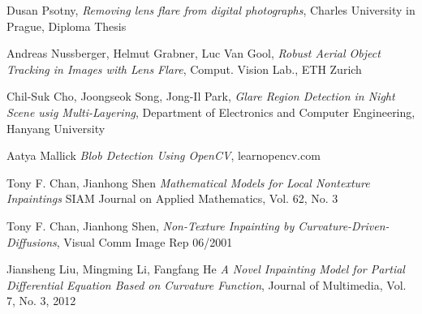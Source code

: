 \documentclass[10pt,twocolumn]{article}
\begin{document}
\lipsum[1]

\begin{thebibliography}{1}

\bibitem
Dusan Psotny,
\emph{Removing lens flare from digital photographs},
Charles University in Prague, Diploma Thesis

\bibitem
Andreas Nussberger, Helmut Grabner, Luc Van Gool,
\emph{Robust Aerial Object Tracking in Images with Lens Flare},
Comput. Vision Lab., ETH Zurich

\bibitem
Chil-Suk Cho, Joongseok Song, Jong-Il Park,
\emph{Glare Region Detection in Night Scene usig Multi-Layering},
Department of Electronics and Computer Engineering, Hanyang University

\bibitem
Aatya Mallick
\emph{Blob Detection Using OpenCV},
learnopencv.com

\bibitem
Tony F. Chan, Jianhong Shen
\emph{Mathematical Models for Local Nontexture Inpaintings}
SIAM Journal on Applied Mathematics, Vol. 62, No. 3

\bibitem
Tony F. Chan, Jianhong Shen,
\emph{Non-Texture Inpainting by Curvature-Driven-Diffusions},
Visual Comm Image Rep 06/2001

\bibitem
Jiansheng Liu, Mingming Li, Fangfang He
\emph{A Novel Inpainting Model for Partial Differential Equation Based on Curvature Function},
Journal of Multimedia, Vol. 7, No. 3, 2012

\end{thebibliography}
\end{document}
